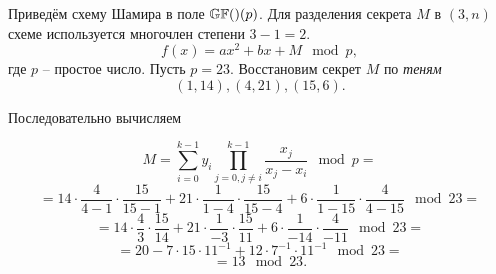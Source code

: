 \example
Приведём схему Шамира в поле $\mathbb{GF}(\left)({p}\right)$. Для разделения секрета $M$ в $(3,n)$ схеме используется многочлен степени $3-1=2$.
    \[ f(x) = a x^2 + b x + M \mod p, \]
где $p$ -- простое число. Пусть $p=23$. Восстановим секрет $M$ по \emph{теням}
    \[ (1,14), (4,21), (15,6). \]

Последовательно вычисляем

    \[ M = \sum\limits_{i=0}^{k-1} y_i \prod\limits_{j=0, j \neq i}^{k-1} \frac{x_j}{x_j - x_i} \mod p = \]
    \[= 14 \cdot \frac{4}{4-1} \cdot \frac{15}{15-1} + 21 \cdot \frac{1}{1-4} \cdot \frac{15}{15-4} + 6 \cdot \frac{1}{1-15} \cdot \frac{4}{4-15} \mod 23 = \]
    \[ =14 \cdot \frac{4}{3} \cdot \frac{15}{14} + 21 \cdot \frac{1}{-3} \cdot \frac{15}{11} + 6 \cdot \frac{1}{-14} \cdot \frac{4}{-11} \mod 23 = \]
    \[= 20 - 7 \cdot 15 \cdot 11^{-1} + 12 \cdot 7^{-1} \cdot 11^{-1} \mod 23 = \]
    \[ = 13 \mod 23.\]
\exampleend
